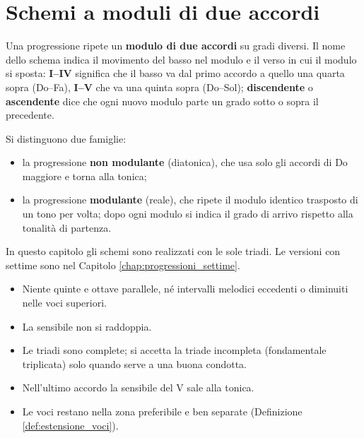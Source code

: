 \chapter{Schemi a moduli di due accordi}
\label{chap:moduli}

Una progressione ripete un \textbf{modulo di due accordi} su gradi diversi. Il nome dello schema indica il movimento del basso nel modulo e il verso in cui il modulo si sposta: \textbf{I--IV} significa che il basso va dal primo accordo a quello una quarta sopra (Do--Fa), \textbf{I--V} che va una quinta sopra (Do--Sol); \textbf{discendente} o \textbf{ascendente} dice che ogni nuovo modulo parte un grado sotto o sopra il precedente.

Si distinguono due famiglie:
\begin{itemize}
	\item la progressione \textbf{non modulante} (diatonica), che usa solo gli accordi di Do maggiore e torna alla tonica;
	\item la progressione \textbf{modulante} (reale), che ripete il modulo identico trasposto di un tono per volta; dopo ogni modulo si indica il grado di arrivo rispetto alla tonalità di partenza.
\end{itemize}

In questo capitolo gli schemi sono realizzati con le sole triadi. Le versioni con settime sono nel Capitolo \ref{chap:progressioni_settime}.

\begin{regola}
	\label{reg:condotta_moduli}
	\begin{itemize}
		\item Niente quinte e ottave parallele, né intervalli melodici eccedenti o diminuiti nelle voci superiori.
		\item La sensibile non si raddoppia.
		\item Le triadi sono complete; si accetta la triade incompleta (fondamentale triplicata) solo quando serve a una buona condotta.
		\item Nell'ultimo accordo la sensibile del V sale alla tonica.
		\item Le voci restano nella zona preferibile e ben separate (Definizione \ref{def:estensione_voci}).
	\end{itemize}
\end{regola}

